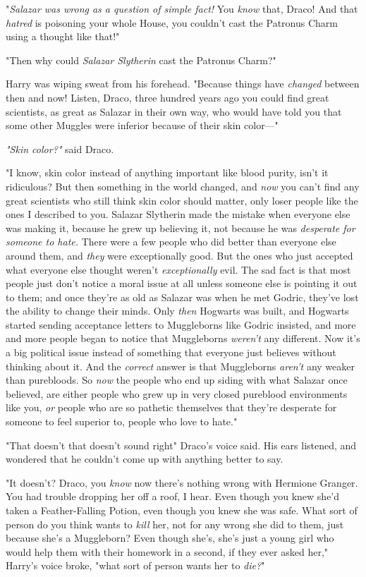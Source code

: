 "\emph{Salazar was wrong as a question of simple fact!} You \emph{know} that,
Draco! And that \emph{hatred} is poisoning your whole House, you couldn't cast
the Patronus Charm using a thought like that!"

"Then why could \emph{Salazar Slytherin} cast the Patronus Charm?"

Harry was wiping sweat from his forehead. "Because things have \emph{changed}
between then and now! Listen, Draco, three hundred years ago you could find
great scientists, as great as Salazar in their own way, who would have told you
that some other Muggles were inferior because of their skin color\mbox{---}"

\emph{"Skin color?"} said Draco.

"I know, skin color instead of anything important like blood purity, isn't it
ridiculous? But then something in the world changed, and \emph{now} you can't
find any great scientists who still think skin color should matter, only loser
people like the ones I described to you. Salazar Slytherin made the mistake
when everyone else was making it, because he grew up believing it, not because
he was \emph{desperate for someone to hate.} There were a few people who did
better than everyone else around them, and \emph{they} were exceptionally good.
But the ones who just accepted what everyone else thought weren't
\emph{exceptionally} evil. The sad fact is that most people just don't notice a
moral issue at all unless someone else is pointing it out to them; and once
they're as old as Salazar was when he met Godric, they've lost the ability to
change their minds. Only \emph{then} Hogwarts was built, and Hogwarts started
sending acceptance letters to Muggleborns like Godric insisted, and more and
more people began to notice that Muggleborns \emph{weren't} any different. Now
it's a big political issue instead of something that everyone just believes
without thinking about it. And the \emph{correct} answer is that Muggleborns
\emph{aren't} any weaker than purebloods. So \emph{now} the people who end up
siding with what Salazar once believed, are either people who grew up in very
closed pureblood environments like you, \emph{or} people who are so pathetic
themselves that they're desperate for someone to feel superior to, people who
love to hate."

"That doesn't{\el} that doesn't sound right{\el}" Draco's voice said. His
ears listened, and wondered that he couldn't come up with anything better to
say.

"It doesn't? Draco, you \emph{know} now there's nothing wrong with Hermione
Granger. You had trouble dropping her off a roof, I hear. Even though you knew
she'd taken a Feather-Falling Potion, even though you knew she was safe. What
sort of person do you think wants to \emph{kill} her, not for any wrong she did
to them, just because she's a Muggleborn? Even though she's, she's just a young
girl who would help them with their homework in a second, if they ever asked
her," Harry's voice broke, "what sort of person wants her to \emph{die?}"

